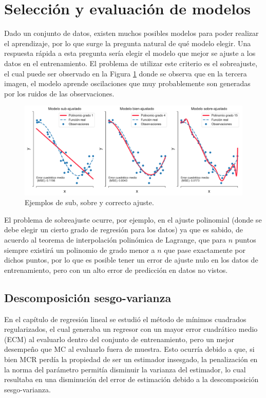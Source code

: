 
\section{Selección y evaluación de modelos}

Dado un conjunto de datos, existen muchos posibles modelos para poder realizar el aprendizaje, por lo que surge la pregunta natural de qué modelo elegir. Una respuesta rápida a esta pregunta sería elegir el modelo que mejor se ajuste a los datos en el entrenamiento. El problema de utilizar este criterio es el sobreajuste, el cual puede ser observado en la Figura \ref{fig:overfitting} donde se observa que en la tercera imagen, el modelo aprende oscilaciones que muy probablemente son generadas por los ruidos de las observaciones. 
\begin{figure}[h!]
    \centering
    \includegraphics[width = 0.9\linewidth]{img/cap4_ajuste.pdf}
    \caption{Ejemplos de sub, sobre y correcto ajuste.}
    \label{fig:overfitting}
\end{figure}

El problema de sobreajuste ocurre, por ejemplo, en el ajuste polinomial (donde se debe elegir un cierto grado de regresión para los datos) ya que es sabido, de acuerdo al teorema de interpolación polinómica de Lagrange, que para $n$ puntos siempre existirá un polinomio de grado menor a $n$ que pase exactamente por dichos puntos, por lo que es posible tener un error de ajuste nulo en los datos de entrenamiento, pero con un alto error de predicción en datos no vistos.

\subsection{Descomposición sesgo-varianza}

En el capítulo de regresión lineal se estudió el método de mínimos cuadrados regularizados, el cual generaba un regresor con un mayor error cuadrático medio (ECM) al evaluarlo dentro del conjunto de entrenamiento, pero un mejor desempeño que MC al evaluarlo fuera de muestra. Esto ocurría debido a que, si bien MCR perdía la propiedad de ser un estimador insesgado, la penalización en la norma del parámetro permitía disminuir la varianza del estimador, lo cual resultaba en una disminución del error de estimación debido a la descomposición sesgo-varianza.\\

